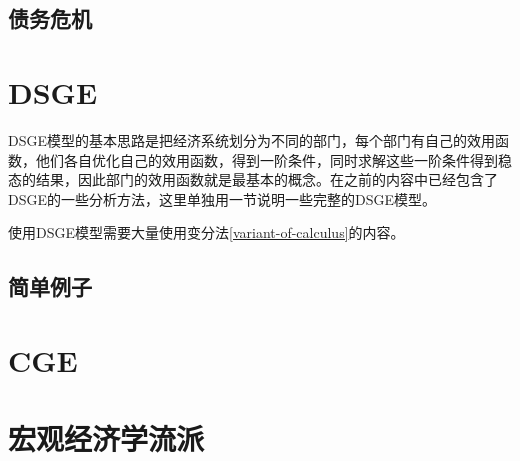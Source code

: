 \subsection{债务危机}

\section{DSGE}
DSGE模型的基本思路是把经济系统划分为不同的部门，每个部门有自己的效用函数，他们各自优化自己的效用函数，得到一阶条件，同时求解这些一阶条件得到稳态的结果，因此部门的效用函数就是最基本的概念。在之前的内容中已经包含了DSGE的一些分析方法，这里单独用一节说明一些完整的DSGE模型。

使用DSGE模型需要大量使用变分法\ref{variant-of-calculus}的内容。

\subsection{简单例子}

\section{CGE}

\section{宏观经济学流派}

